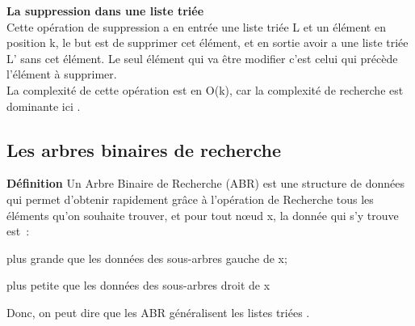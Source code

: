 \documentclass[hidelinks,a4paper,12pt]{article}
\begin{document}
\textbf {La suppression dans une liste triée} \\
Cette opération de suppression a en entrée une liste triée L et un élément en position k, le but est de supprimer cet élément, et en sortie avoir a une liste triée L' sans cet élément. Le seul élément qui va être modifier c’est celui qui précède l’élément à supprimer.\\
La complexité de cette opération est en O(k), car la complexité de recherche est dominante ici \cite{NoteCours2}. \\






	\subsection{Les arbres binaires de recherche}
	\bigbreak 
\textbf {Définition} \medskip  
Un Arbre Binaire de Recherche (ABR) est une structure de données qui permet d'obtenir rapidement grâce à l'opération de Recherche tous les éléments qu'on souhaite trouver, et pour tout nœud x, la donnée qui s’y trouve est : 
\begin{description}[font=$\bullet$~\normalfont\scshape\color{red!50!black}]
	\item plus grande que les données des sous-arbres gauche de x;
	\item plus petite que les données des sous-arbres droit de x 
\end{description} 	
Donc, on peut dire que les ABR généralisent les listes triées \cite{NoteCours}.
\end{document}
